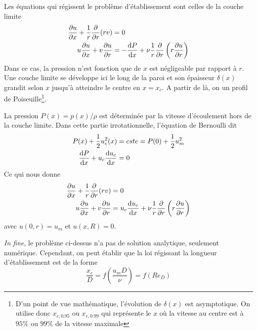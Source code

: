     Les équations qui régissent le problème d'établissement sont celles de la couche limite
    \begin{equation}
      \begin{aligned}
        \pdv{u}{x} + \frac{1}{r} \pdv{r}(rv) &= 0\\
        u\pdv{u}{x} + v \pdv{u}{r} &= -\dv{P}{x} + \nu \frac{1}{r} \pdv{r}\left(r\pdv{u}{r}\right)
      \end{aligned}
    \end{equation}
    Dans ce cas, la pression n'est fonction que de $x$ est négligeable par rapport à $r$. Une couche limite se développe ici le long de la paroi et son épaisseur $\delta(x)$ grandit selon $x$ jusqu'à atteindre le centre en $x = x_c$. A partir de là, on un profil de Poiseuille\footnote{D'un point de vue mathématique, l'évolution de $\delta(x)$ est asymptotique. On utilise donc $x_{c,0.95}$ ou $x_{c,0.99}$ qui représente le $x$ où la vitesse au centre est à $95\%$ ou $99\%$ de la vitesse maximale}.

    La pression $P(x) = p(x)/\rho$ est déterminée par la vitesse d'écoulement hors de la couche limite. Dans cette partie irrotationnelle, l'équation de Bernoulli dit
    \begin{equation}
      \begin{aligned}
        P(x) +\frac{1}{2} u_c^2(x) &= cste = P(0) + \frac{1}{2}u_m^2\\
        \dv{P}{x} + u_c \dv{u_c}{x} &=0
      \end{aligned}
    \end{equation}
    Ce qui nous donne
    \begin{equation}
      \begin{aligned}
        \pdv{u}{x} + \frac{1}{r} \pdv{r}(rv) &= 0\\
        u\pdv{u}{x} + v \pdv{u}{r} &= u_c \dv{u_c}{x} + \nu \frac{1}{r} \pdv{r}\left(r\pdv{u}{r}\right)
      \end{aligned}
    \end{equation}
    avec $u(0, r) = u_m$ et $u(x, R)= 0$.

    \textit{In fine}, le problème ci-dessus n'a pas de solution analytique, seulement numérique. Cependant, on peut établir que la loi régissant la longueur d'établissement est de la forme
    \begin{equation}
      \frac{x_c}{D} = f\left(\frac{u_m D}{\nu}\right) = f(Re_D)
    \end{equation}
